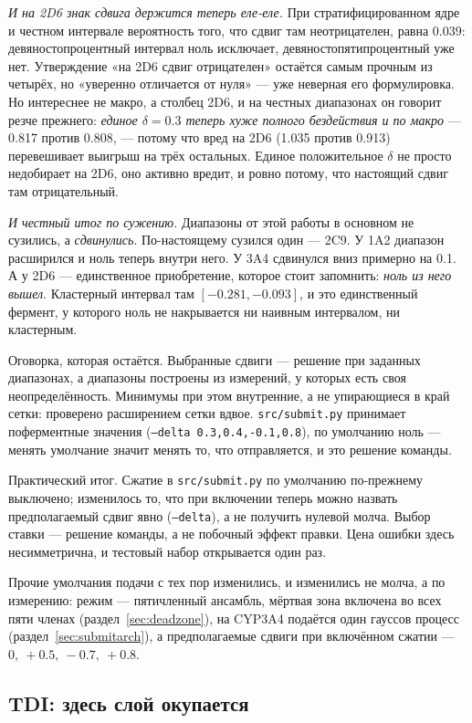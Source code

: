 \emph{И на 2D6 знак сдвига держится теперь еле-еле.} При стратифицированном ядре и честном
интервале вероятность того, что сдвиг там неотрицателен, равна 0.039: девяностопроцентный
интервал ноль исключает, девяностопятипроцентный уже нет. Утверждение «на 2D6 сдвиг
отрицателен» остаётся самым прочным из четырёх, но «уверенно отличается от нуля» --- уже
неверная его формулировка. Но интереснее не макро, а столбец 2D6, и на честных диапазонах он говорит
резче прежнего: \emph{единое $\delta = 0.3$ теперь хуже полного бездействия и по макро}
--- 0.817 против 0.808, --- потому что вред на 2D6 (1.035 против 0.913) перевешивает выигрыш
на трёх остальных. Единое положительное $\delta$ не просто недобирает на 2D6, оно активно
вредит, и ровно потому, что настоящий сдвиг там отрицательный.

\emph{И честный итог по сужению.} Диапазоны от этой работы в основном не сузились, а
\emph{сдвинулись}. По-настоящему сузился один --- 2C9. У 1A2 диапазон расширился и ноль
теперь внутри него. У 3A4 сдвинулся вниз примерно на 0.1. А у 2D6 --- единственное
приобретение, которое стоит запомнить: \emph{ноль из него вышел}. Кластерный интервал там
$[-0.281, -0.093]$, и это единственный фермент, у которого ноль не накрывается ни наивным
интервалом, ни кластерным.

Оговорка, которая остаётся. Выбранные сдвиги --- решение при заданных диапазонах, а диапазоны
построены из измерений, у которых есть своя неопределённость. Минимумы при этом внутренние,
а не упирающиеся в край сетки: проверено расширением сетки вдвое. \texttt{src/submit.py}
принимает поферментные значения (\texttt{--delta 0.3,0.4,-0.1,0.8}), по умолчанию ноль ---
менять умолчание значит менять то, что отправляется, и это решение команды.

Практический итог. Сжатие в \texttt{src/submit.py} по умолчанию по-прежнему выключено;
изменилось то, что при включении теперь можно назвать предполагаемый сдвиг явно
(\texttt{--delta}), а не получить нулевой молча. Выбор ставки --- решение команды, а не побочный
эффект правки. Цена ошибки здесь несимметрична, и тестовый набор открывается один раз.

Прочие умолчания подачи с тех пор изменились, и изменились не молча, а по измерению: режим ---
пятичленный ансамбль, мёртвая зона включена во всех пяти членах (раздел~\ref{sec:deadzone}), на
CYP3A4 подаётся один гауссов процесс (раздел~\ref{sec:submitarch}), а предполагаемые сдвиги при
включённом сжатии --- $0,\ +0.5,\ -0.7,\ +0.8$.

\subsection{TDI: здесь слой окупается}

